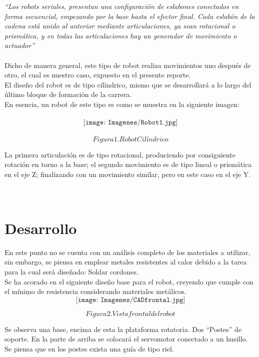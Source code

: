 \documentclass[12pt,a4paper]{report}
\begin{document}
\textit{“Los robots seriales, presentan una configuración de eslabones conectados en forma secuencial, empezando por la base hasta el efector final. Cada eslabón de la cadena está unido al anterior mediante articulaciones, ya sean rotacional o prismática, y en todas las articulaciones hay un generador de movimiento o actuador”}
\\\\
Dicho de manera general, este tipo de robot realiza movimientos uno después de otro, el cual es nuestro caso, expuesto en el presente reporte.\\
El diseño del robot es de tipo cilíndrico, mismo que se desarrollará a lo largo del último bloque de formación de la carrera.\\
En esencia, un robot de este tipo es como se muestra en la siguiente imagen:\\\\

$$\texttt{[image: Imagenes/Robot1.jpg]}$$\\

$$Figura 1. Robot Cilíndrico$$

La primera articulación es de tipo rotacional, produciendo por consiguiente rotación en torno a la base; el segundo movimiento es de tipo lineal o prismática en el eje Z; finalizando con un movimiento similar, pero en este caso en el eje Y.\\\\\\

\section*{Desarrollo}

En este punto no se cuenta con un análisis completo de los materiales a utilizar, sin embargo, se piensa en emplear metales resistentes al calor debido a la tarea para la cual será diseñado: Soldar cordones.\\
Se ha acorado en el siguiente diseño base para el robot, creyendo que cumple con el mínimo de resistencia considerando materiales metálicos.\\

$$\texttt{[image: Imagenes/CADfrontal.jpg]}$$

$$Figura 2. Vista frontal del robot$$

Se observa una base, encima de esta la plataforma rotatoria. Dos “Postes” de soporte. En la parte de arriba se colocará el servomotor conectado a un husillo.
Se piensa que en los postes exista una guía de tipo riel.\\
\end{document}
